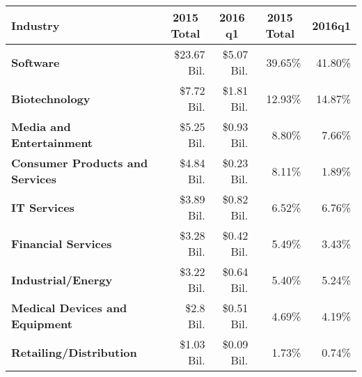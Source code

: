 
\begin{table}[!htbp]
    
    \hspace*{-1.5cm}
    \begin{tabular}{lrrrr}
        \textbf{Industry}                       & \multicolumn{1}{c}{\textbf{2015 Total}} & \multicolumn{1}{c}{\textbf{2016 q1}} & \multicolumn{1}{c}{\textbf{2015 Total}} & \multicolumn{1}{c}{\textbf{2016q1}} \\ \hline
        \textbf{Software}                       & \$23.67 Bil.                   & \$5.07 Bil.                 & 39.65\%                         & 41.80\%                    \\ \hline
        \textbf{Biotechnology}                  & \$7.72 Bil.                    & \$1.81 Bil.                 & 12.93\%                         & 14.87\%                    \\ \hline
        \textbf{Media and Entertainment}        & \$5.25 Bil.                    & \$0.93 Bil.                 & 8.80\%                          & 7.66\%                     \\ \hline
        \textbf{Consumer Products and Services} & \$4.84 Bil.                    & \$0.23 Bil.                 & 8.11\%                          & 1.89\%                     \\ \hline
        \textbf{IT Services}                    & \$3.89 Bil.                    & \$0.82 Bil.                 & 6.52\%                          & 6.76\%                     \\ \hline
        \textbf{Financial Services}             & \$3.28 Bil.                    & \$0.42 Bil.                 & 5.49\%                          & 3.43\%                     \\ \hline
        \textbf{Industrial/Energy}              & \$3.22 Bil.                    & \$0.64 Bil.                 & 5.40\%                          & 5.24\%                     \\ \hline
        \textbf{Medical Devices and Equipment}  & \$2.8 Bil.                     & \$0.51 Bil.                 & 4.69\%                          & 4.19\%                     \\ \hline
        \textbf{Retailing/Distribution}         & \$1.03 Bil.                    & \$0.09 Bil.                 & 1.73\%                          & 0.74\%                     \\ \hline

\end{tabular}
\end{table}

